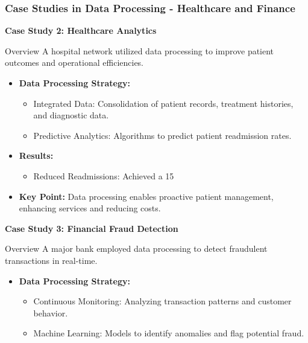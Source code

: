 \documentclass[aspectratio=169]{beamer}
\begin{document}
\begin{frame}[fragile]
    \frametitle{Case Studies in Data Processing - Healthcare and Finance}
    
    \textbf{Case Study 2: Healthcare Analytics}
    
    \begin{block}{Overview}
        A hospital network utilized data processing to improve patient outcomes and operational efficiencies.
    \end{block}
    
    \begin{itemize}
        \item \textbf{Data Processing Strategy:}
        \begin{itemize}
            \item Integrated Data: Consolidation of patient records, treatment histories, and diagnostic data.
            \item Predictive Analytics: Algorithms to predict patient readmission rates.
        \end{itemize}
        
        \item \textbf{Results:}
        \begin{itemize}
            \item Reduced Readmissions: Achieved a 15%
        \end{itemize}
        
        \item \textbf{Key Point:}
        Data processing enables proactive patient management, enhancing services and reducing costs.
    \end{itemize}
    
    \vspace{1em} %
    
    \textbf{Case Study 3: Financial Fraud Detection}

    \begin{block}{Overview}
        A major bank employed data processing to detect fraudulent transactions in real-time.
    \end{block}

    \begin{itemize}
        \item \textbf{Data Processing Strategy:}
        \begin{itemize}
            \item Continuous Monitoring: Analyzing transaction patterns and customer behavior.
            \item Machine Learning: Models to identify anomalies and flag potential fraud.
        \end{itemize}
        

\end{itemize}
\end{frame}
\end{document}

